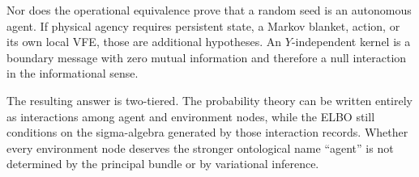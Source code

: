Nor does the operational equivalence prove that a random seed is an autonomous
agent.  If physical agency requires persistent state, a Markov blanket,
action, or its own local VFE, those are additional hypotheses.  An
$Y$-independent kernel is a boundary message with zero mutual information and
therefore a null interaction in the informational sense.

The resulting answer is two-tiered.  The probability theory can be written
entirely as interactions among agent and environment nodes, while the ELBO
still conditions on the sigma-algebra generated by those interaction records.
Whether every environment node deserves the stronger ontological name
``agent'' is not determined by the principal bundle or by variational
inference.  
